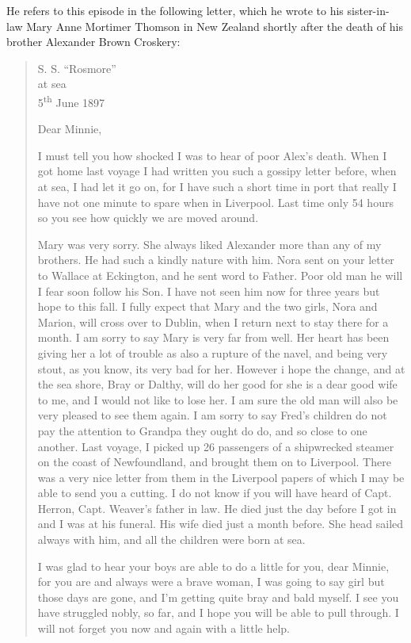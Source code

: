 He refers to this episode in the  following letter, which he wrote to his sister-in-law Mary Anne Mortimer Thomson in New Zealand shortly after the death of his brother Alexander Brown Croskery:\cite{SMWCletter}
\begin{quotation}
\begin{flushright}
S. S. ``Rosmore'' \\
at sea \\
5\textsuperscript{th} June 1897
\end{flushright}

Dear Minnie,

I must tell you how shocked I was to hear of poor Alex's death. When I got home last voyage I had written you such a gossipy letter before, when at sea, I had let it go on, for I have such a short time in port that really I have not one minute to spare when in Liverpool. Last time only 54 hours so you see how quickly we are moved around.

Mary was very sorry. She always liked Alexander more than any of my brothers. He had such a kindly nature with him. Nora sent on your letter to Wallace at Eckington, and he sent word to Father. Poor old man he will I fear soon follow his Son. I have not seen him now for three years but hope to this fall. I fully expect that Mary and the two girls, Nora and Marion, will cross over to Dublin, when I return next to stay there for a month. I am sorry to say Mary is very far from well. Her heart has been giving her a lot of trouble as also a rupture of the navel, and being very stout, as you know, its very bad for her. However i hope the change, and at the sea shore, Bray or Dalthy, will do her good for she is a dear good wife to me, and I would not like to lose her. I am sure the old man will also be very pleased to see them again. I am sorry to say Fred's children do not pay the attention to Grandpa they ought do do, and so close to one another. Last voyage, I picked up 26 passengers of a shipwrecked steamer on the coast of Newfoundland, and brought them on to Liverpool. There was a very nice letter from them in the Liverpool papers of which I may be able to send you a cutting. I do not know if you will have heard of Capt. Herron, Capt. Weaver's father in law. He died just the day before I got in and I was at his funeral. His wife died just a month before. She head sailed always with him, and all the children were born at sea.

I was glad to hear your boys are able to do a little for you, dear Minnie, for you are and always were a brave woman, I was going to say girl but those days are gone, and I'm getting quite bray and bald myself. I see you have struggled nobly, so far, and I hope you will be able to pull through. I will not forget you now and again with a little help.


\end{quotation}
